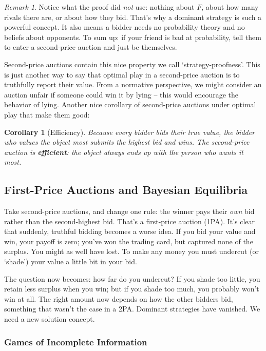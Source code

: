\documentclass[12pt]{article}
\newtheorem{corollary}[theorem]{Corollary}
\theoremstyle{definition}
\theoremstyle{remark}
\newtheorem{remark}[theorem]{Remark}
\theoremstyle{plain}                          %
\begin{document}
\begin{remark}
Notice what the proof did \emph{not} use: nothing about $F$, about how many rivals there are, or about how they bid. That's why a dominant strategy is such a powerful concept. It also means a bidder needs no probability theory and no beliefs about
opponents. To sum up: if your friend is bad at probability, tell them to enter a second-price auction and just be themselves.
\end{remark}

Second-price auctions contain this nice property we call `strategy-proofness'. This is just another way to say that optimal play in a second-price auction is to truthfully report their value. From a normative perspective, we might consider an auction unfair if someone could win it by lying -- this would encourage the behavior of lying. Another nice corollary of second-price auctions under optimal play that make them good:

\begin{corollary}[Efficiency]
Because every bidder bids their true value, the bidder who values the object most
submits the highest bid and wins. The second-price auction is \textbf{efficient}:
the object always ends up with the person who wants it most.
\end{corollary}

\subsection{First-Price Auctions and Bayesian Equilibria}\label{sec:first}

Take second-price auctions, and change one rule: the winner pays their \emph{own} bid rather than the second-highest bid. That's a first-price auction (1PA). It's clear that suddenly, truthful bidding becomes a worse idea. If you bid your value and win, your payoff is zero; you've won the trading card, but captured none of the surplus. You might as well have lost. To make any money you must undercut (or `shade') your value a little bit in your bid.

The question now becomes: how far do you undercut? If you shade too little, you retain less surplus when you win; but if you shade too much, you probably won't win at all. The right amount now depends on how the other bidders bid, something that wasn't the case in a 2PA. Dominant strategies have vanished. We need a new solution concept.

\subsubsection{Games of Incomplete Information}
\end{document}
